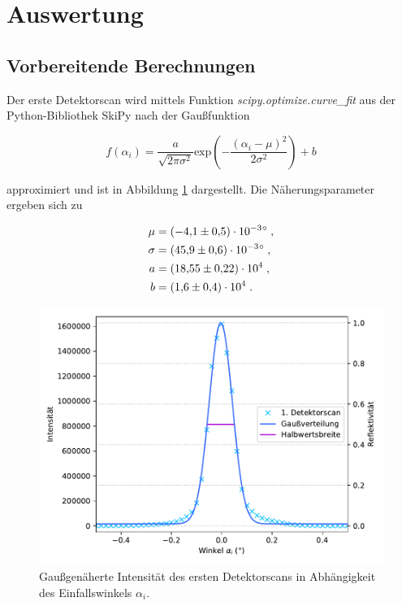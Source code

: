 \vspace{+15pt}
\section{Auswertung}
\label{sec:Auswertung}

\vspace{+15pt}
\subsection{Vorbereitende Berechnungen}
\vspace{+5pt}

Der erste Detektorscan wird mittels Funktion 
\textit{scipy.optimize.curve\_fit} aus der Python-Bibliothek SkiPy nach der Gaußfunktion

\vspace{-9pt}
\begin{equation}
    f(\alpha_i) = \frac{a}{\sqrt{2 \pi \sigma^2}} \text{exp}\left(- \frac{(\alpha_i - \mu)^2}{2\sigma^2}\right) + b
\end{equation}

approximiert und ist in Abbildung \ref{fig:plot1} dargestellt.
Die Näherungsparameter ergeben sich zu
\vspace{-25pt}

\begin{align*}
    \mu &= (\num{-4.1 +- 0.5}) \cdot 10^{-3}\si{\degree} \; ,\\
    \sigma &= (\num{45.9 +- 0.6}) \cdot 10^{-3} \si{\degree} \; ,\\
    a &= (\num{18.55 +- 0.22}) \cdot 10^4 \; ,\\
    b &= (\num{1.6 +- 0.4}) \cdot 10^4 \; .
\end{align*}

\vspace{-7pt}
\begin{figure}[H]
    \centering
    \includegraphics[scale=0.7]{content/plot1.pdf}
    \vspace{-10pt}
    \caption{Gaußgenäherte Intensität des ersten Detektorscans in Abhängigkeit des Einfallswinkels $\alpha_i$.}
    \label{fig:plot1}
\end{figure}

